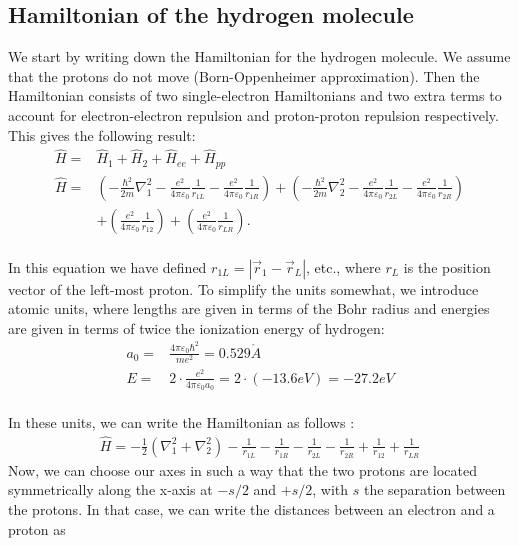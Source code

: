 \subsection{Hamiltonian of the hydrogen molecule}
We start by writing down the Hamiltonian for the hydrogen molecule. We assume that the protons do not move (Born-Oppenheimer approximation). Then the Hamiltonian consists of two single-electron Hamiltonians and two extra terms to account for electron-electron repulsion and proton-proton repulsion respectively. This gives the following result:
\begin{align}	   
\hat H =& {\hat H_1} + {\hat H_2} + {\hat H_{ee}} + {\hat H_{pp}}\\
\hat H =& \left( { - \frac{{{\hbar ^2}}}{{2m}}\nabla _1^2 - \frac{{{e^2}}}{{4\pi {\varepsilon _0}}}\frac{1}{{{r_{1L}}}} - \frac{{{e^2}}}{{4\pi {\varepsilon _0}}}\frac{1}{{{r_{1R}}}}} \right) + \left( { - \frac{{{\hbar ^2}}}{{2m}}\nabla _2^2 - \frac{{{e^2}}}{{4\pi {\varepsilon _0}}}\frac{1}{{{r_{2L}}}} - \frac{{{e^2}}}{{4\pi {\varepsilon _0}}}\frac{1}{{{r_{2R}}}}} \right)\nonumber\\
& + \left( {\frac{{{e^2}}}{{4\pi {\varepsilon _0}}}\frac{1}{{{r_{12}}}}} \right) + \left( {\frac{{{e^2}}}{{4\pi {\varepsilon _0}}}\frac{1}{{{r_{LR}}}}} \right).
\end{align}\\
In this equation we have defined ${r_{1L}} = \left| {{{\vec r}_1} - {{\vec r}_L}} \right|$, etc., where $r_L$ is the position vector of the left-most proton. To simplify the units somewhat, we introduce atomic units, where lengths are given in terms of the Bohr radius and energies are given in terms of twice the ionization energy of hydrogen:
\begin{align}
{a_0} =& \frac{{4\pi {\varepsilon _0}{\hbar ^2}}}{{m{e^2}}} = 0.529\mathring{A}\\
E =& 2 \cdot \frac{{{e^2}}}{{4\pi {\varepsilon _0}{a_0}}} = 2 \cdot \left( { - 13.6eV} \right) =  - 27.2eV
\end{align}\\
In these units, we can write the Hamiltonian as follows \cite{MSU_paper}:
\begin{align}
\hat H =  - \frac{1}{2}\left( {\nabla _1^2 + \nabla _2^2} \right) - \frac{1}{{{r_{1L}}}} - \frac{1}{{{r_{1R}}}} - \frac{1}{{{r_{2L}}}} - \frac{1}{{{r_{2R}}}} + \frac{1}{{{r_{12}}}} + \frac{1}{{{r_{LR}}}}
\end{align}
Now, we can choose our axes in such a way that the two protons are located symmetrically along the x-axis at $-s/2$ and $+s/2$, with $s$ the separation between the protons. In that case, we can write the distances between an electron and a proton as
